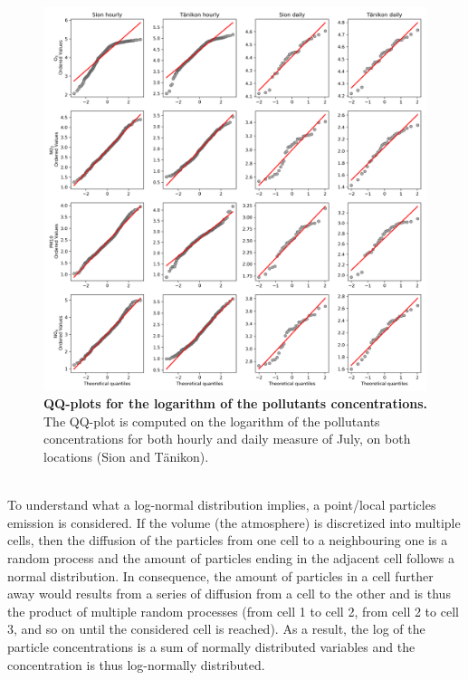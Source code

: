 \documentclass[a4paper, 12pt]{article}
\begin{document}
    \\
    \begin{figure}[t!]
        \centering
        \includegraphics[width = 1 \textwidth]{Figures/QQplots.png}
        \caption{\textbf{QQ-plots for the logarithm of the pollutants concentrations.} The QQ-plot is computed on the logarithm of the pollutants concentrations for both hourly and daily measure of July, on both locations (Sion and Tänikon).}
        \label{fig:QQ-plots}
    \end{figure}
    \\
    To understand what a log-normal distribution implies, a point/local particles emission is considered. If the volume (the atmosphere) is discretized into multiple cells, then the diffusion of the particles from one cell to a neighbouring one is a random process and the amount of particles ending in the adjacent cell follows a normal distribution. In consequence, the amount of particles in a cell further away would results from a series of diffusion from a cell to the other and is thus the product of multiple random processes (from cell 1 to cell 2, from cell 2 to cell 3, and so on until the considered cell is reached). As a result, the log of the particle concentrations is a sum of normally distributed variables and the concentration is thus log-normally distributed. 
    \\ 
\end{document}

